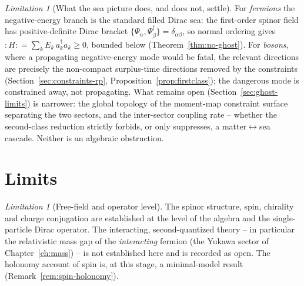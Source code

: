 \documentclass[11pt,oneside]{book}
\theoremstyle{plain}
\theoremstyle{definition}
\theoremstyle{remark}
\newtheorem{limitation}[theorem]{Limitation}
\begin{document}
\begin{limitation}[What the sea picture does, and does not, settle]
\label{lim:sea}
For \emph{fermions} the negative-energy branch is the standard filled Dirac sea: the
first-order spinor field has positive-definite Dirac bracket
$\{\Psi_\alpha,\Psi^\dagger_\beta\}=\delta_{\alpha\beta}$, so normal ordering gives
$\mathop{:}\!H\!\mathop{:}=\sum_k E_k\,a_k^\dagger a_k\ge0$, bounded below
(Theorem~\ref{thm:no-ghost}). For \emph{bosons}, where a propagating negative-energy
mode would be fatal, the relevant directions are precisely the non-compact
surplus-time directions removed by the constraints
(Section~\ref{sec:constraints-rp}, Proposition~\ref{prop:firstclass}); the dangerous
mode is constrained away, not propagating. What remains open
(Section~\ref{sec:ghost-limits}) is narrower: the global topology of the moment-map
constraint surface separating the two sectors, and the inter-sector coupling rate --
whether the second-class reduction strictly forbids, or only suppresses, a
matter$\leftrightarrow$sea cascade. Neither is an algebraic obstruction.
\end{limitation}

\section{Limits}
\label{sec:spinor-limits}

\begin{limitation}[Free-field and operator level]
\label{lim:spinor}
The spinor structure, spin, chirality and charge conjugation are established at the
level of the algebra and the single-particle Dirac operator. The interacting,
second-quantized theory -- in particular the relativistic mass gap of the
\emph{interacting} fermion (the Yukawa sector of Chapter~\ref{ch:mass}) -- is not
established here and is recorded as open. The holonomy account of spin is, at this
stage, a minimal-model result (Remark~\ref{rem:spin-holonomy}).
\end{limitation}
\end{document}

